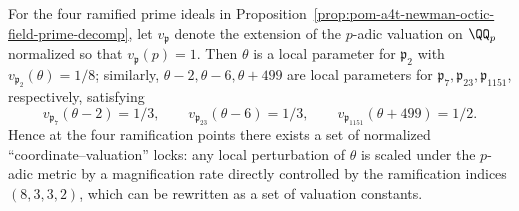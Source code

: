 \begin{remark}\label{rem:pom-a4t-newman-octic-field-local-parameters}
For the four ramified prime ideals in Proposition~\ref{prop:pom-a4t-newman-octic-field-prime-decomp}, let \(v_{\mathfrak p}\) denote the extension of the \(p\)-adic valuation on \(\QQ_p\) normalized so that \(v_{\mathfrak p}(p)=1\).
Then \(\theta\) is a local parameter for \(\mathfrak p_2\) with
\(
v_{\mathfrak p_2}(\theta)=1/8
\);
similarly,
\(
\theta-2,\theta-6,\theta+499
\)
are local parameters for \(\mathfrak p_7,\mathfrak p_{23},\mathfrak p_{1151}\), respectively, satisfying
\[
v_{\mathfrak p_7}(\theta-2)=1/3,\qquad
v_{\mathfrak p_{23}}(\theta-6)=1/3,\qquad
v_{\mathfrak p_{1151}}(\theta+499)=1/2.
\]
Hence at the four ramification points there exists a set of normalized ``coordinate–valuation'' locks: any local perturbation of \(\theta\) is scaled under the \(p\)-adic metric by a magnification rate directly controlled by the ramification indices \((8,3,3,2)\), which can be rewritten as a set of valuation constants.
\end{remark}


